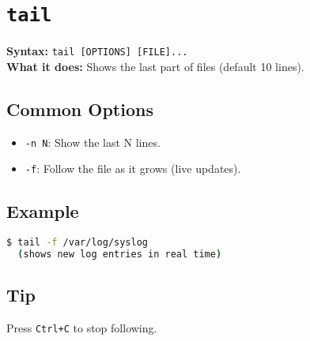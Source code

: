 \documentclass[10pt,oneside]{scrbook}
\begin{document}
\section{\texttt{tail}}
\begin{cmdbox}
  \textbf{Syntax:} \lstinline!tail [OPTIONS] [FILE]...! \\
  \textbf{What it does:} Shows the last part of files (default 10 lines).
\end{cmdbox}
\begin{commanddetails}
  \subsection*{Common Options}
  \begin{itemize}
    \item \lstinline!-n N!: Show the last N lines.
    \item \lstinline!-f!: Follow the file as it grows (live updates).
  \end{itemize}

  \subsection*{Example}
  \begin{lstlisting}[language=bash]
$ tail -f /var/log/syslog
  (shows new log entries in real time)
  \end{lstlisting}

  \subsection*{Tip}
  Press \texttt{Ctrl+C} to stop following.
\end{commanddetails}

\end{document}
